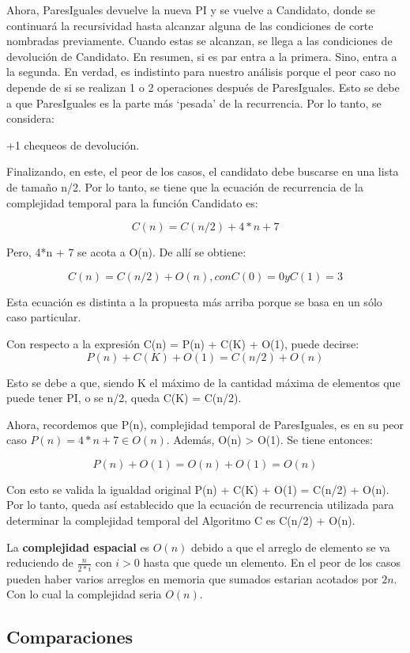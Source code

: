 \documentclass{article}
\begin{document}
Ahora, ParesIguales devuelve la nueva PI y se vuelve a Candidato, donde se continuará la 
recursividad hasta alcanzar alguna de las condiciones de corte nombradas previamente. 
Cuando estas se alcanzan, se llega a las condiciones de devolución de Candidato. 
En resumen, si es par entra a la primera. Sino, entra a la segunda. 
En verdad, es indistinto para nuestro análisis porque el peor caso no depende de 
si se realizan 1 o 2 operaciones después de ParesIguales. Esto se debe a que 
ParesIguales es la parte más ‘pesada’ de la recurrencia. Por lo tanto, se considera:

+1 chequeos de devolución.

Finalizando, en este, el peor de los casos, el candidato debe buscarse en una 
lista de tamaño n/2. Por lo tanto, se tiene que la ecuación de recurrencia de la complejidad temporal para la función Candidato es:

\[
    C(n) = C(n/2) + 4*n + 7    
\]

Pero, 4*n + 7 se acota a O(n). De allí se obtiene:

\[
    C(n) = C(n/2) + O(n), con C(0) = 0 y C(1) = 3  
\]

Esta ecuación es distinta a la propuesta más arriba porque se basa en un sólo caso particular.

Con respecto a la expresión C(n) = P(n) + C(K) + O(1), puede decirse: 
\[
    P(n) + C(K) + O(1) = C(n/2) + O(n)    
\]

Esto se debe a que, siendo K el máximo de la cantidad máxima de elementos que puede tener PI, 
o se n/2, queda C(K) = C(n/2).

Ahora, recordemos que P(n), complejidad temporal de ParesIguales, es en su peor caso \(P(n) = 4*n + 7 \in O(n)\).
Además, O(n) > O(1). Se tiene entonces:

\[
    P(n) + O(1) = O(n) + O(1) = O(n)  
\]

Con esto se valida la igualdad original P(n) + C(K) + O(1) = C(n/2) + O(n). 
Por lo tanto, queda así establecido que la ecuación de recurrencia utilizada 
para determinar la complejidad temporal del Algoritmo C es C(n/2) + O(n).

La \textbf{complejidad espacial} es \(O(n)\) debido a que el arreglo de elemento se va reduciendo de \( \frac{n}{2*i} \) con \(i > 0\) hasta que quede un elemento. 
En el peor de los casos pueden haber varios arreglos en memoria que sumados estarian acotados por \(2n\). 
Con lo cual la complejidad seria \(O(n)\).

\newpage
\subsection{Comparaciones}
\end{document}
